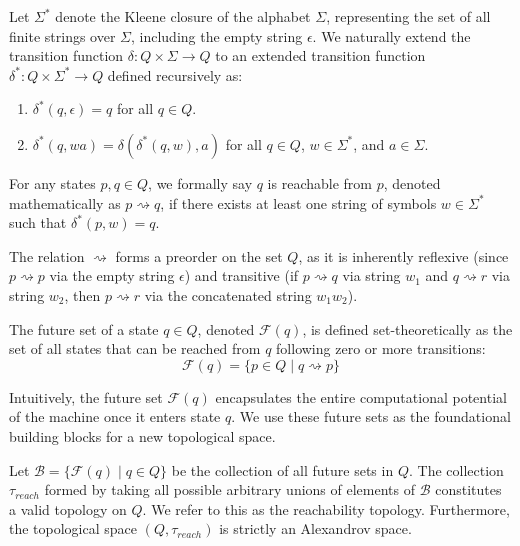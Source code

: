 \begin{definition}
\label{def:reachability}
Let $\Sigma^*$ denote the Kleene closure of the alphabet $\Sigma$, representing the set of all finite strings over $\Sigma$, including the empty string $\epsilon$. We naturally extend the transition function $\delta: Q \times \Sigma \to Q$ to an extended transition function $\delta^*: Q \times \Sigma^* \to Q$ defined recursively as:
\begin{enumerate}
    \item $\delta^*(q, \epsilon) = q$ for all $q \in Q$.
    \item $\delta^*(q, wa) = \delta(\delta^*(q, w), a)$ for all $q \in Q$, $w \in \Sigma^*$, and $a \in \Sigma$.
\end{enumerate}
For any states $p, q \in Q$, we formally say $q$ is reachable from $p$, denoted mathematically as $p \rightsquigarrow q$, if there exists at least one string of symbols $w \in \Sigma^*$ such that $\delta^*(p, w) = q$.
\end{definition}

The relation $\rightsquigarrow$ forms a preorder on the set $Q$, as it is inherently reflexive (since $p \rightsquigarrow p$ via the empty string $\epsilon$) and transitive (if $p \rightsquigarrow q$ via string $w_1$ and $q \rightsquigarrow r$ via string $w_2$, then $p \rightsquigarrow r$ via the concatenated string $w_1 w_2$).

\begin{definition}
\label{def:future_set}
The future set of a state $q \in Q$, denoted $\mathcal{F}(q)$, is defined set-theoretically as the set of all states that can be reached from $q$ following zero or more transitions:
\[
\mathcal{F}(q) = \{ p \in Q \mid q \rightsquigarrow p \}
\]
\end{definition}

Intuitively, the future set $\mathcal{F}(q)$ encapsulates the entire computational potential of the machine once it enters state $q$. We use these future sets as the foundational building blocks for a new topological space.

\begin{theorem}
\label{thm:reachability_topology}
Let $\mathcal{B} = \{ \mathcal{F}(q) \mid q \in Q \}$ be the collection of all future sets in $Q$. The collection $\tau_{reach}$ formed by taking all possible arbitrary unions of elements of $\mathcal{B}$ constitutes a valid topology on $Q$. We refer to this as the reachability topology. Furthermore, the topological space $(Q, \tau_{reach})$ is strictly an Alexandrov space.
\end{theorem}

